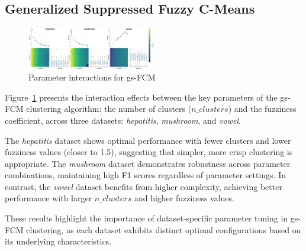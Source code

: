 \subsection{Generalized Suppressed Fuzzy C-Means}
\label{subsec:fuzzycmeansresults}

\begin{figure}[ht!]
    \includegraphics[width=0.5\textwidth]{figures/interactions_fuzzy_cmeans.png}
    \caption{Parameter interactions for gs-FCM}
    \label{fig:interactions_gsfcm}
\end{figure}


Figure~\ref{fig:interactions_gsfcm} presents the interaction effects between the key parameters of the gs-FCM clustering algorithm: the number of clusters ($n\_clusters$) and the fuzziness coefficient, across three datasets: \textit{hepatitis}, \textit{mushroom}, and \textit{vowel}.

The \textit{hepatitis} dataset shows optimal performance with fewer clusters and lower fuzziness values (closer to 1.5), suggesting that simpler, more crisp clustering is appropriate. The \textit{mushroom} dataset demonstrates robustness across parameter combinations, maintaining high F1 scores regardless of parameter settings. In contrast, the \textit{vowel} dataset benefits from higher complexity, achieving better performance with larger $n\_clusters$ and higher fuzziness values.

These results highlight the importance of dataset-specific parameter tuning in gs-FCM clustering, as each dataset exhibits distinct optimal configurations based on its underlying characteristics.


